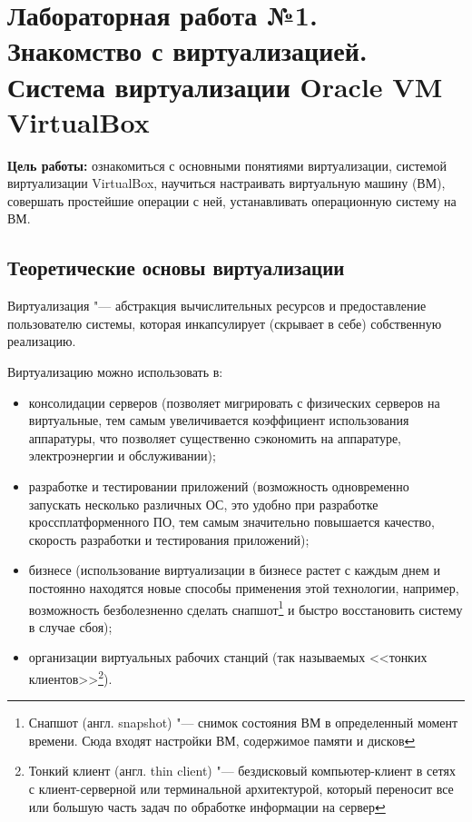 \section[ЛР №1. Знакомство с виртуализацией, VirtualBox]{Лабораторная работа №1. \\
Знакомство с виртуализацией. Система виртуализации Oracle VM VirtualBox}

\textbf{Цель работы:} ознакомиться с основными понятиями виртуализации, системой виртуализации VirtualBox, научиться настраивать виртуальную машину (ВМ), совершать простейшие операции с ней, устанавливать операционную систему на ВМ.

\subsection{Теоретические основы виртуализации}

Виртуализация "--- абстракция вычислительных ресурсов и предоставление пользователю системы, которая инкапсулирует (скрывает в себе) собственную реализацию.

Виртуализацию можно использовать в:
\begin{itemize}
    \item консолидации серверов (позволяет мигрировать с физических серверов на виртуальные, тем самым увеличивается коэффициент использования аппаратуры, что позволяет существенно сэкономить на аппаратуре, электроэнергии и обслуживании);
    \item разработке и тестировании приложений (возможность одновременно запускать несколько различных ОС, это удобно при разработке кроссплатформенного ПО, тем самым значительно повышается качество, скорость разработки и тестирования приложений);
    \item бизнесе (использование виртуализации в бизнесе растет с каждым днем и постоянно находятся новые способы применения этой технологии, например, возможность безболезненно сделать снапшот\footnote{Снапшот (англ. snapshot) "--- снимок состояния ВМ в определенный момент времени. Сюда входят настройки ВМ, содержимое памяти и дисков} и быстро восстановить систему в случае сбоя);
    \item организации виртуальных рабочих станций (так называемых <<тонких клиентов>>\footnote{Тонкий клиент (англ. thin client) "--- бездисковый компьютер-клиент в сетях с клиент-серверной или терминальной архитектурой, который переносит все или большую часть задач по обработке информации на сервер}).
\end{itemize}


